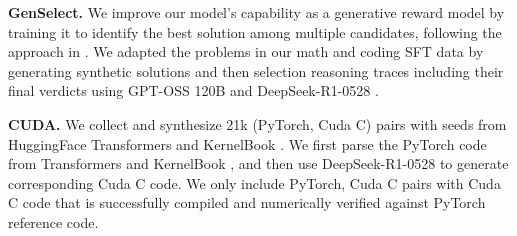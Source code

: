
\textbf{GenSelect.} We improve our model’s capability as a generative reward model by training it to identify the best solution among multiple candidates, following the approach in \cite{toshniwal2025genselectgenerativeapproachbestofn}. We adapted the problems in our math and coding SFT data by generating synthetic solutions and then selection reasoning traces including their final verdicts using GPT-OSS 120B \citep{openai2025gptoss120bgptoss20bmodel} and DeepSeek-R1-0528 \citep{deepseekai2025deepseekr1incentivizingreasoningcapability}.  

\textbf{CUDA.} We collect and synthesize 21k (PyTorch, Cuda C) pairs with seeds from HuggingFace Transformers \citep{wolf-etal-2020-transformers} and KernelBook \citep{kernelbook2025}. We first parse the PyTorch code from Transformers \citep{wolf-etal-2020-transformers} and KernelBook \citep{kernelbook2025}, and then use DeepSeek-R1-0528 \citep{deepseekai2025deepseekr1incentivizingreasoningcapability} to generate corresponding Cuda C code. We only include {PyTorch, Cuda C} pairs with Cuda C code that is successfully compiled and numerically verified against PyTorch reference code. 

